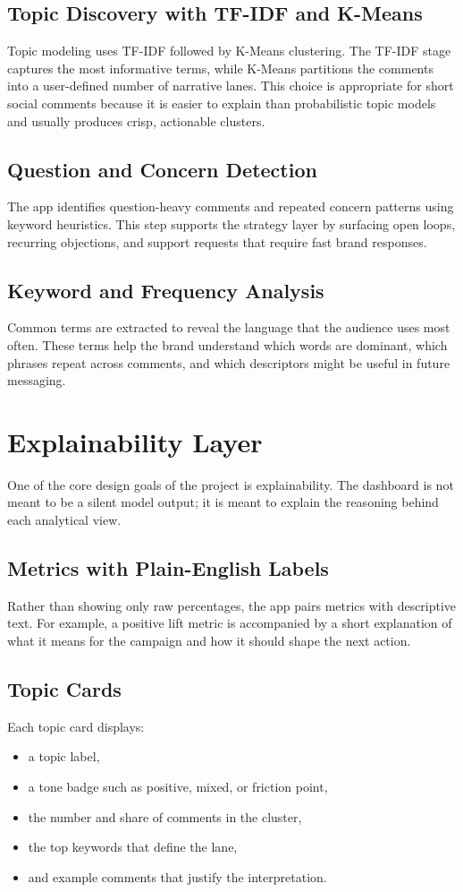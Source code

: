 \subsection{Topic Discovery with TF-IDF and K-Means}
Topic modeling uses TF-IDF followed by K-Means clustering. The TF-IDF stage captures the most informative terms, while K-Means partitions the comments into a user-defined number of narrative lanes. This choice is appropriate for short social comments because it is easier to explain than probabilistic topic models and usually produces crisp, actionable clusters.

\subsection{Question and Concern Detection}
The app identifies question-heavy comments and repeated concern patterns using keyword heuristics. This step supports the strategy layer by surfacing open loops, recurring objections, and support requests that require fast brand responses.

\subsection{Keyword and Frequency Analysis}
Common terms are extracted to reveal the language that the audience uses most often. These terms help the brand understand which words are dominant, which phrases repeat across comments, and which descriptors might be useful in future messaging.

\section{Explainability Layer}
One of the core design goals of the project is explainability. The dashboard is not meant to be a silent model output; it is meant to explain the reasoning behind each analytical view.

\subsection{Metrics with Plain-English Labels}
Rather than showing only raw percentages, the app pairs metrics with descriptive text. For example, a positive lift metric is accompanied by a short explanation of what it means for the campaign and how it should shape the next action.

\subsection{Topic Cards}
Each topic card displays:
\begin{itemize}
    \item a topic label,
    \item a tone badge such as positive, mixed, or friction point,
    \item the number and share of comments in the cluster,
    \item the top keywords that define the lane,
    \item and example comments that justify the interpretation.
\end{itemize}

